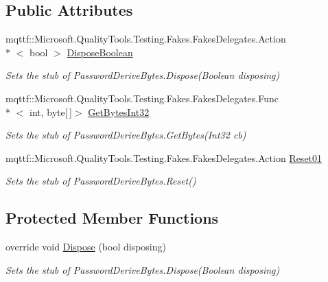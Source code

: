 \subsection*{Public Attributes}
\begin{DoxyCompactItemize}
\item 
mqttf\-::\-Microsoft.\-Quality\-Tools.\-Testing.\-Fakes.\-Fakes\-Delegates.\-Action\\*
$<$ bool $>$ \hyperlink{class_system_1_1_security_1_1_cryptography_1_1_fakes_1_1_stub_password_derive_bytes_aa5f753385c93e398460fa6b82336dddb}{Dispose\-Boolean}
\begin{DoxyCompactList}\small\item\em Sets the stub of Password\-Derive\-Bytes.\-Dispose(\-Boolean disposing)\end{DoxyCompactList}\item 
mqttf\-::\-Microsoft.\-Quality\-Tools.\-Testing.\-Fakes.\-Fakes\-Delegates.\-Func\\*
$<$ int, byte\mbox{[}$\,$\mbox{]}$>$ \hyperlink{class_system_1_1_security_1_1_cryptography_1_1_fakes_1_1_stub_password_derive_bytes_a7bf2c47535b13808adc732d10783fcf9}{Get\-Bytes\-Int32}
\begin{DoxyCompactList}\small\item\em Sets the stub of Password\-Derive\-Bytes.\-Get\-Bytes(\-Int32 cb)\end{DoxyCompactList}\item 
mqttf\-::\-Microsoft.\-Quality\-Tools.\-Testing.\-Fakes.\-Fakes\-Delegates.\-Action \hyperlink{class_system_1_1_security_1_1_cryptography_1_1_fakes_1_1_stub_password_derive_bytes_ad1ed81f1c6411beb81b173d147ea5b70}{Reset01}
\begin{DoxyCompactList}\small\item\em Sets the stub of Password\-Derive\-Bytes.\-Reset()\end{DoxyCompactList}\end{DoxyCompactItemize}
\subsection*{Protected Member Functions}
\begin{DoxyCompactItemize}
\item 
override void \hyperlink{class_system_1_1_security_1_1_cryptography_1_1_fakes_1_1_stub_password_derive_bytes_ae67399c79b182fe1495eb02daa21090f}{Dispose} (bool disposing)
\begin{DoxyCompactList}\small\item\em Sets the stub of Password\-Derive\-Bytes.\-Dispose(\-Boolean disposing)\end{DoxyCompactList}\end{DoxyCompactItemize}
